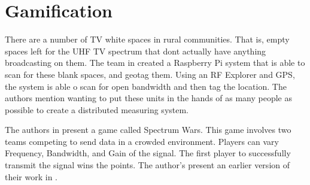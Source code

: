 \section{Gamification} 
There are a number of TV white spaces in rural communities. That is, empty spaces left for the UHF TV spectrum that dont actually have anything broadcasting on them. The team in \cite{6684374} created a Raspberry Pi system that is able to scan for these blank spaces, and geotag them. Using an RF Explorer and GPS, the system is able o scan for open bandwidth and then tag the location. The authors mention wanting to put these units in the hands of as many people as possible to create a distributed measuring system. 

The authors in \cite{6826076} present a game called Spectrum Wars. This game involves two teams 
competing to send data in a crowded environment. Players can vary Frequency, Bandwidth, and Gain of 
the signal. The first player to successfully transmit the signal wins the points. The author's present
an earlier version of their work in \cite{6817817}. 

